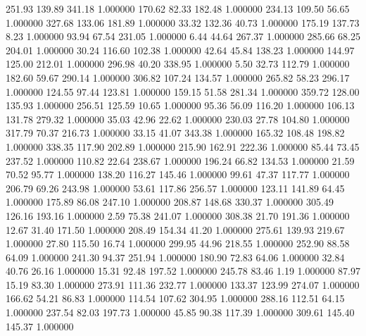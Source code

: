     251.93    139.89    341.18  1.000000
    170.62     82.33    182.48  1.000000
    234.13    109.50     56.65  1.000000
    327.68    133.06    181.89  1.000000
     33.32    132.36     40.73  1.000000
    175.19    137.73      8.23  1.000000
     93.94     67.54    231.05  1.000000
      6.44     44.64    267.37  1.000000
    285.66     68.25    204.01  1.000000
     30.24    116.60    102.38  1.000000
     42.64     45.84    138.23  1.000000
    144.97    125.00    212.01  1.000000
    296.98     40.20    338.95  1.000000
      5.50     32.73    112.79  1.000000
    182.60     59.67    290.14  1.000000
    306.82    107.24    134.57  1.000000
    265.82     58.23    296.17  1.000000
    124.55     97.44    123.81  1.000000
    159.15     51.58    281.34  1.000000
    359.72    128.00    135.93  1.000000
    256.51    125.59     10.65  1.000000
     95.36     56.09    116.20  1.000000
    106.13    131.78    279.32  1.000000
     35.03     42.96     22.62  1.000000
    230.03     27.78    104.80  1.000000
    317.79     70.37    216.73  1.000000
     33.15     41.07    343.38  1.000000
    165.32    108.48    198.82  1.000000
    338.35    117.90    202.89  1.000000
    215.90    162.91    222.36  1.000000
     85.44     73.45    237.52  1.000000
    110.82     22.64    238.67  1.000000
    196.24     66.82    134.53  1.000000
     21.59     70.52     95.77  1.000000
    138.20    116.27    145.46  1.000000
     99.61     47.37    117.77  1.000000
    206.79     69.26    243.98  1.000000
     53.61    117.86    256.57  1.000000
    123.11    141.89     64.45  1.000000
    175.89     86.08    247.10  1.000000
    208.87    148.68    330.37  1.000000
    305.49    126.16    193.16  1.000000
      2.59     75.38    241.07  1.000000
    308.38     21.70    191.36  1.000000
     12.67     31.40    171.50  1.000000
    208.49    154.34     41.20  1.000000
    275.61    139.93    219.67  1.000000
     27.80    115.50     16.74  1.000000
    299.95     44.96    218.55  1.000000
    252.90     88.58     64.09  1.000000
    241.30     94.37    251.94  1.000000
    180.90     72.83     64.06  1.000000
     32.84     40.76     26.16  1.000000
     15.31     92.48    197.52  1.000000
    245.78     83.46      1.19  1.000000
     87.97     15.19     83.30  1.000000
    273.91    111.36    232.77  1.000000
    133.37    123.99    274.07  1.000000
    166.62     54.21     86.83  1.000000
    114.54    107.62    304.95  1.000000
    288.16    112.51     64.15  1.000000
    237.54     82.03    197.73  1.000000
     45.85     90.38    117.39  1.000000
    309.61    145.40    145.37  1.000000
